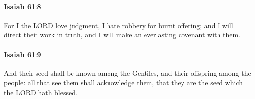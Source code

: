 		\paragraph{Isaiah 61:8} %
			\label{ISAIAH-61-8}

			For I the LORD love judgment, I hate robbery for burnt offering; and I will direct their work in truth, and I will make an everlasting covenant with them.


		\paragraph{Isaiah 61:9} %
			\label{ISAIAH-61-9}

			And their seed shall be known among the Gentiles, and their offspring among the people: all that see them shall acknowledge them, that they are the seed which the LORD hath blessed.


